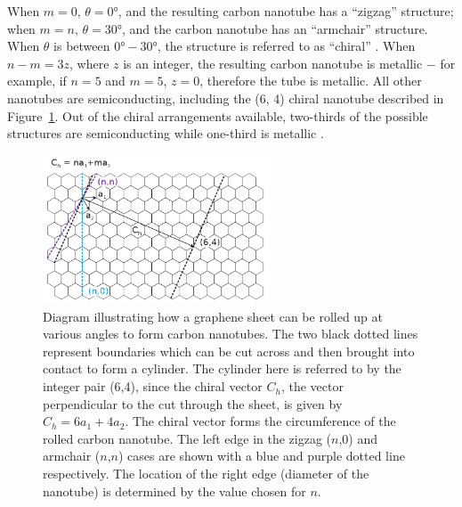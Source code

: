 \documentclass[
  a4paper,
]{scrbook}
\begin{document}
When \(m= 0\), \(\theta = 0°\), and the resulting carbon nanotube has a
``zigzag'' structure; when \(m = n\), \(\theta = 30°\), and the carbon
nanotube has an ``armchair'' structure. When \(\theta\) is between
\(0°-30°\), the structure is referred to as ``chiral''
\autocite{Dekker1999,Lu2012}. When \(n-m = 3z\), where \(z\) is an
integer, the resulting carbon nanotube is metallic \(-\) for example, if
\(n=5\) and \(m=5\), \(z=0\), therefore the tube is metallic. All other
nanotubes are semiconducting, including the (6, 4) chiral nanotube
described in Figure~\ref{fig-carbon-nanotube-wrapping}. Out of the
chiral arrangements available, two-thirds of the possible structures are
semiconducting while one-third is metallic \autocite{Dekker1999}.

\begin{figure}

{\centering \includegraphics[width=0.6\textwidth,height=\textheight]{figures/ch2/carbon_nanotube_wrapping.png}

}

\caption[Diagram illustrating how a graphene sheet can be rolled up at
various angles to form carbon
nanotubes.]{\label{fig-carbon-nanotube-wrapping}Diagram illustrating how
a graphene sheet can be rolled up at various angles to form carbon
nanotubes. The two black dotted lines represent boundaries which can be
cut across and then brought into contact to form a cylinder. The
cylinder here is referred to by the integer pair (6,4), since the chiral
vector \(C_h\), the vector perpendicular to the cut through the sheet,
is given by \(C_h = 6a_1+4a_2\). The chiral vector forms the
circumference of the rolled carbon nanotube. The left edge in the zigzag
(\(n\),0) and armchair (\(n\),\(n\)) cases are shown with a blue and
purple dotted line respectively. The location of the right edge
(diameter of the nanotube) is determined by the value chosen for \(n\).}

\end{figure}
\end{document}
